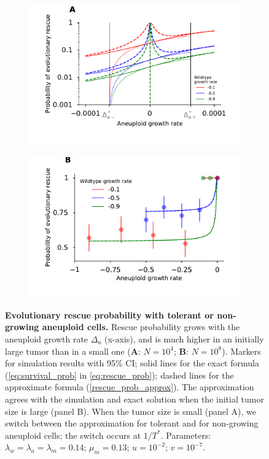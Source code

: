 \documentclass[12pt]{extarticle}
\begin{document}
\begin{figure}
\begin{subfigure}{0.5\textwidth}
\includegraphics[width=1\textwidth]{Figures/P_est_divergence.pdf}
\end{subfigure}
\begin{subfigure}{0.5\textwidth}
\includegraphics[width=1\textwidth]{Figures/P_est_divergenceLargePopulation.pdf}
\end{subfigure}
\caption{\textbf{Evolutionary rescue probability with tolerant or non-growing aneuploid cells.}
Rescue probability grows with the aneuploid growth rate $\Delta_a$ (x-axis), and is much higher in an initially large tumor than in a small one (\textbf{A}: $N=10^4$; \textbf{B}: $N=10^8$). 
Markers for simulation results with 95\% CI; 
solid lines for the exact formula (\cref{eq:survival_prob} in \cref{eq:rescue_prob});
dashed lines for the approximate formula (\cref{rescue_prob_approx}).
The approximation agrees with the simulation and exact solution when the initial tumor size is large (panel B).
When the tumor size is small (panel A), we switch between the approximation for tolerant and for non-growing aneuploid cells; the switch occurs at $1/T^*$. %
Parameters: $\lambda_w=\lambda_a=\lambda_m=0.14$; $\mu_m=0.13$; $u=10^{-2}$; $v=10^{-7}$.
}
\label{rescue_prob_an_growth}
\end{figure}
\end{document}
